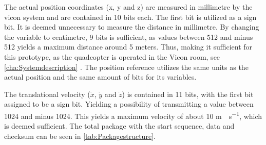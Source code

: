 The actual position coordinates (x, y and z) are measured in millimetre by the vicon system and are contained in 10 bits each. The first bit is utilized as a sign bit. It is deemed unnecessary to measure the distance in millimetre. By changing the variable to centimetre, 9 bits is sufficient, as values between 512 and minus 512 yields a maximum distance around 5 meters. Thus, making it sufficient for this prototype, as the quadcopter is operated in the Vicon room, see \autoref{cha:Systemdescription} . The position reference utilizes the same units as the actual position and the same amount of bits for its variables.

The translational velocity ($\dot{x}$, $\dot{y}$ and $\dot{z}$) is contained in 11 bits, with the first bit assigned to be a sign bit. Yielding a possibility of transmitting a value between 1024 and minus 1024. This yields a maximum velocity of about 10 \si{m \cdot s^{-1}}, which is deemed sufficient. The total package with the start sequence, data and checksum can be seen in \autoref{tab:Packagestructure}.


